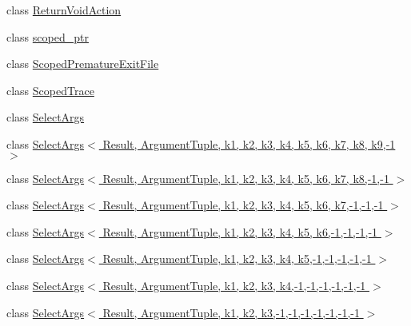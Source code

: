 \begin{DoxyCompactItemize}
class \hyperlink{classtesting_1_1internal_1_1_return_void_action}{Return\+Void\+Action}
\item 
class \hyperlink{classtesting_1_1internal_1_1scoped__ptr}{scoped\+\_\+ptr}
\item 
class \hyperlink{classtesting_1_1internal_1_1_scoped_premature_exit_file}{Scoped\+Premature\+Exit\+File}
\item 
class \hyperlink{classtesting_1_1internal_1_1_scoped_trace}{Scoped\+Trace}
\item 
class \hyperlink{classtesting_1_1internal_1_1_select_args}{Select\+Args}
\item 
class \hyperlink{classtesting_1_1internal_1_1_select_args_3_01_result_00_01_argument_tuple_00_01k1_00_01k2_00_01kbad6295bde1bc89afd5e3dfe4d52ae94}{Select\+Args$<$ Result, Argument\+Tuple, k1, k2, k3, k4, k5, k6, k7, k8, k9,-\/1 $>$}
\item 
class \hyperlink{classtesting_1_1internal_1_1_select_args_3_01_result_00_01_argument_tuple_00_01k1_00_01k2_00_01kfe88afb049e01b4212b0813ab5a9c813}{Select\+Args$<$ Result, Argument\+Tuple, k1, k2, k3, k4, k5, k6, k7, k8,-\/1,-\/1 $>$}
\item 
class \hyperlink{classtesting_1_1internal_1_1_select_args_3_01_result_00_01_argument_tuple_00_01k1_00_01k2_00_01k597f472c4e3b394b8bb76f22686b8756}{Select\+Args$<$ Result, Argument\+Tuple, k1, k2, k3, k4, k5, k6, k7,-\/1,-\/1,-\/1 $>$}
\item 
class \hyperlink{classtesting_1_1internal_1_1_select_args_3_01_result_00_01_argument_tuple_00_01k1_00_01k2_00_01kcf9f143d8f94d88842866ea3565bd3c0}{Select\+Args$<$ Result, Argument\+Tuple, k1, k2, k3, k4, k5, k6,-\/1,-\/1,-\/1,-\/1 $>$}
\item 
class \hyperlink{classtesting_1_1internal_1_1_select_args_3_01_result_00_01_argument_tuple_00_01k1_00_01k2_00_01k6e7fa8d2e210d646d72ee410b10aa03c}{Select\+Args$<$ Result, Argument\+Tuple, k1, k2, k3, k4, k5,-\/1,-\/1,-\/1,-\/1,-\/1 $>$}
\item 
class \hyperlink{classtesting_1_1internal_1_1_select_args_3_01_result_00_01_argument_tuple_00_01k1_00_01k2_00_01k69e12b55446b1a17c0daec13dac1d86f}{Select\+Args$<$ Result, Argument\+Tuple, k1, k2, k3, k4,-\/1,-\/1,-\/1,-\/1,-\/1,-\/1 $>$}
\item 
class \hyperlink{classtesting_1_1internal_1_1_select_args_3_01_result_00_01_argument_tuple_00_01k1_00_01k2_00_01k662b7b95311371409ab0c0d22a638b79}{Select\+Args$<$ Result, Argument\+Tuple, k1, k2, k3,-\/1,-\/1,-\/1,-\/1,-\/1,-\/1,-\/1 $>$}
\item 

\end{DoxyCompactItemize}
